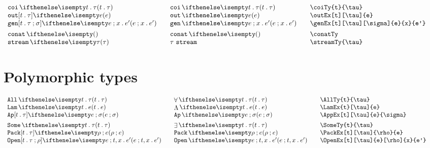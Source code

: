 \documentclass[11pt]{article}
\begin{document}
\begin{small}
\begin{displaymath}
\begin{array}{l@{\qquad}l@{\qquad}l@{\qquad}l}
      \coiTy{t}{\tau}                            & \coiTy*{t}{\tau}                & \verb|\coiTy{t}{\tau}|                            \\
      \outEx[t][\tau]{e}                         & \outEx*{e}                      & \verb|\outEx[t][\tau]{e}|                         \\
      \genEx[t][\tau][\sigma]{e}{x}{e'}          & \genEx*{e}{x}{e'}               & \verb|\genEx[t][\tau][\sigma]{e}{x}{e'}|          \\[1ex]

      \conatTy{}                                 & \conatTy*{}                     & \verb|\conatTy|                                   \\
      \streamTy{\tau}                            & \streamTy*{\tau}                & \verb|\streamTy{\tau}|
    \end{array}
  \end{displaymath}
\end{small}

\section*{Polymorphic types}
\begin{small}
  \begin{displaymath}
    \begin{array}{l@{\qquad}l@{\qquad}l@{\qquad}l}
      \AllTy{t}{\tau}                  & \AllTy*{t}{\tau}                  & \verb|\AllTy{t}{\tau}|                  \\
      \LamEx{t}[\tau]{e}               & \LamEx*{t}{e}                     & \verb|\LamEx{t}[\tau]{e}|               \\
      \AppEx[t][\tau]{e}{\sigma}       & \AppEx*{e}{\sigma}                & \verb|\AppEx[t][\tau]{e}{\sigma}|       \\[1ex]
      \SomeTy{t}{\tau}                 & \SomeTy*{t}{\tau}                 & \verb|\SomeTy{t}{\tau}|                 \\
      \PackEx[t][\tau]{\rho}{e}        & \PackEx*{\rho}{e}                 & \verb|\PackEx[t][\tau]{\rho}{e}|        \\
      \OpenEx[t][\tau]{e}[\rho]{x}{e'} & \OpenEx*[t][\tau]{e}[\rho]{x}{e'} & \verb|\OpenEx[t][\tau]{e}[\rho]{x}{e'}|
    \end{array}
  \end{displaymath}
\end{small}
\end{document}
